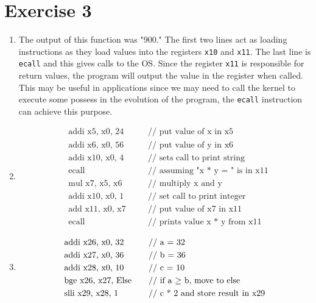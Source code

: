 \documentclass[12pt]{article}
\begin{document}
    \section*{Exercise 3}
    \begin{enumerate}
        \item
            The output of this function was "900." The first two lines act as loading instructions as they load values into the registers \verb+x10+ and \verb+x11+. The last line is \verb+ecall+ and this gives calls to the OS. Since the register \verb+x11+ is responsible for return values, the program will output the value in the register when called. This may be useful in applications since we may need to call the kernel to execute some possess in the evolution of the program, the \verb+ecall+ instruction can achieve this purpose.
        \item
            \begin{align*}
                &\text{addi x5, x0, 24}\quad &&\text{// put value of x in x5} \\
                &\text{addi x6, x0, 56}\quad &&\text{// put value of y in x6} \\
                &\text{addi x10, x0, 4}\quad &&\text{// sets call to print string} \\
                &\text{ecall}\quad &&\text{// assuming "x * y = " is in x11} \\
                &\text{mul x7, x5, x6}\quad &&\text{// multiply x and y} \\
                &\text{addi x10, x0, 1}\quad &&\text{// set call to print integer} \\
                &\text{add x11, x0, x7}\quad &&\text{// put value of x7 in x11} \\
                &\text{ecall}\quad &&\text{// prints value x * y from x11}
            \end{align*}
        \item
            \begin{align*}
                &\text{addi x26, x0, 32}\quad &&\text{// a = 32} \\
                &\text{addi x27, x0, 36}\quad &&\text{// b = 36} \\
                &\text{addi x28, x0, 10}\quad &&\text{// c = 10} \\
                &\text{bge x26, x27, Else}\quad &&\text{// if a $ \ge $ b, move to else} \\
                &\text{slli x29, x28, 1}\quad &&\text{// c * 2 and store result in x29} \\

\end{align*}
\end{enumerate}
\end{document}
